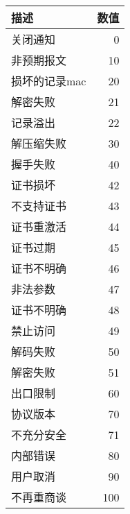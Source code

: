 \documentclass[11pt]{article}
\begin{document}
\begin{center}
\begin{tabular}{|l|r|}
        \hline 
        描述& 数值 \\
        \hline
        关闭通知&0 \\
     非预期报文& 10 \\
 损坏的记录mac & 20\\
        解密失败& 21 \\
        记录溢出& 22 \\
     解压缩失败& 30 \\
        握手失败& 40 \\
        证书损坏& 42\\
     不支持证书& 43 \\
     证书重激活& 44\\
        证书过期& 45 \\
     证书不明确&46\\
        非法参数& 47\\
     证书不明确& 48\\
        禁止访问& 49\\
        解码失败& 50\\
        解密失败& 51\\
        出口限制& 60\\
        协议版本& 70\\
     不充分安全& 71\\
        内部错误& 80\\
        用户取消& 90\\
     不再重商谈& 100\\
        \hline

\end{tabular}

\end{center}







%
%
%




%
%
% 
%
\end{document}
